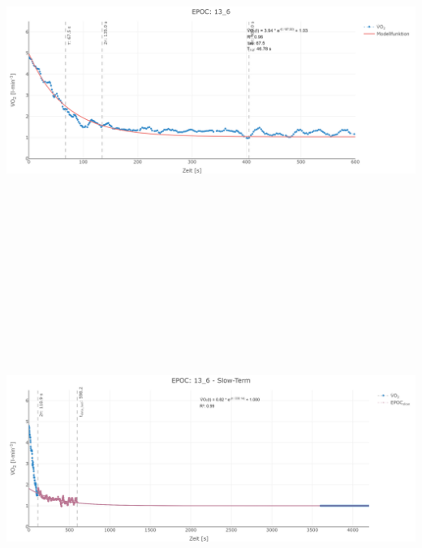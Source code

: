 \documentclass[
  letterpaper,
  DIV=11]{scrartcl}
\begin{document}
\includegraphics[width=11.45833in,height=4.6875in]{images/13_6_tau.png}
\includegraphics[width=11.45833in,height=4.6875in]{images/13_6_slow.png}
\end{document}
